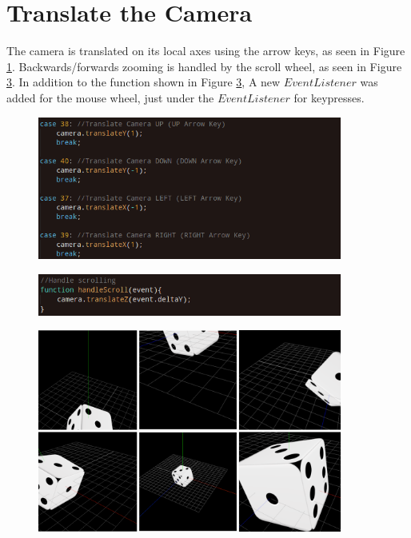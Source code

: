 \documentclass[12pt]{article}
\begin{document}
\section{Translate the Camera}
The camera is translated on its local axes using the arrow keys, as seen in Figure \ref{fig:7}. Backwards/forwards zooming is handled by
the scroll wheel, as seen in Figure \ref{fig:8}. In addition to the function shown in Figure \ref{fig:8}, A new $EventListener$ was added for the mouse wheel, just under the $EventListener$ for keypresses.
\begin{figure}[H]  
  \centering
  \includegraphics[width=10cm]{6.png}
  \caption{}
  \label{fig:7}
\end{figure}
\begin{figure}[H]  
  \centering
  \includegraphics[width=10cm]{7.png}
  \caption{}
  \label{fig:8}
\end{figure}
\begin{figure}[H]  
  \centering
  \includegraphics[width=10cm]{req5.png}
  \caption{}
  \label{fig:8}
\end{figure}
\end{document}
